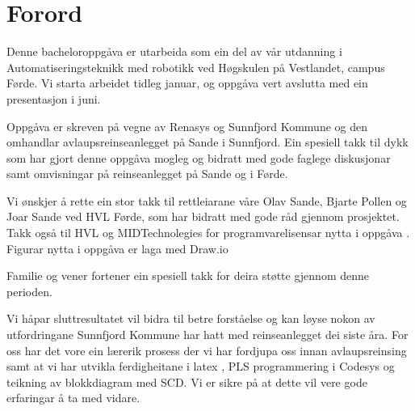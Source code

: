 \chapter{Forord}
\thispagestyle{romanpages}

Denne bacheloroppgåva er utarbeida som ein del av vår utdanning i Automatiseringsteknikk med robotikk ved Høgskulen på Vestlandet, campus Førde.
Vi starta arbeidet tidleg januar, og oppgåva vert avslutta med ein presentasjon i juni.

Oppgåva er skreven på vegne av \gls{Renasys} \citep{Renasys} og \gls{Sunnfjord Kommune} \citep{SunnfjordKommune} og den omhandlar 
avlaupsreinseanlegget på Sande i Sunnfjord. 
Ein spesiell takk til dykk som har gjort denne oppgåva mogleg og
bidratt med gode faglege diskusjonar samt omvisningar på reinseanlegget på Sande og i Førde.

Vi ønskjer å rette ein stor takk til rettleiarane våre Olav Sande, Bjarte Pollen og Joar Sande ved \gls{HVL} Førde, som har bidratt med gode råd gjennom prosjektet.
Takk også til \gls{HVL} \citep{HVL} og MIDTechnolegies \citep{MIDT} for programvarelisensar nytta i oppgåva \citep{MIDTToolbox} \citep{Microsoft}. \newline
Figurar nytta i oppgåva er laga med Draw.io \citep{DrawIO}

Familie og vener fortener ein spesiell takk for deira støtte gjennom denne perioden.

Vi håpar sluttresultatet vil bidra til betre forståelse og kan løyse nokon av utfordringane \gls{Sunnfjord Kommune} har hatt med reinseanlegget dei siste åra.
For oss har det vore ein lærerik prosess der vi har fordjupa oss innan avlaupsreinsing samt at vi har utvikla ferdigheitane i \gls{latex} \citep{MikTeX} \citep{VisualStudio}, 
\gls{PLS} programmering i \gls{Codesys} \citep{Codesys} og teikning av blokkdiagram med \gls{SCD}. Vi er sikre på at dette vil vere gode erfaringar å ta med vidare.
 